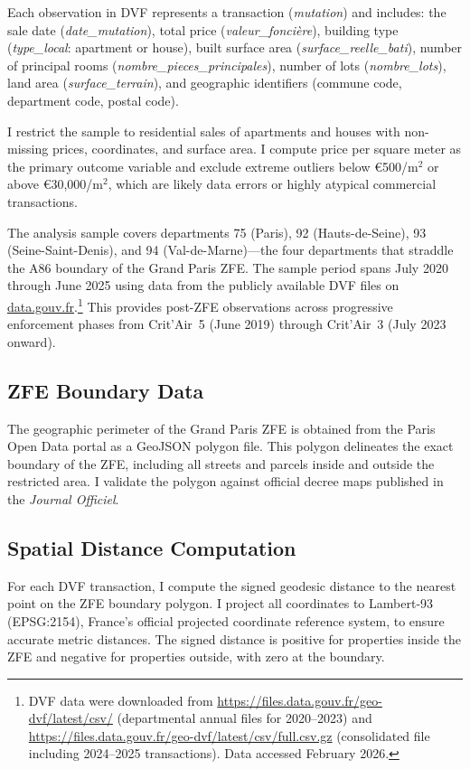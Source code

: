 \documentclass[12pt]{article}
\begin{document}
Each observation in DVF represents a transaction (\textit{mutation}) and includes: the sale date (\textit{date\_mutation}), total price (\textit{valeur\_fonci\`ere}), building type (\textit{type\_local}: apartment or house), built surface area (\textit{surface\_reelle\_bati}), number of principal rooms (\textit{nombre\_pieces\_principales}), number of lots (\textit{nombre\_lots}), land area (\textit{surface\_terrain}), and geographic identifiers (commune code, department code, postal code).

I restrict the sample to residential sales of apartments and houses with non-missing prices, coordinates, and surface area. I compute price per square meter as the primary outcome variable and exclude extreme outliers below \euro{}500/m$^2$ or above \euro{}30,000/m$^2$, which are likely data errors or highly atypical commercial transactions.

The analysis sample covers departments 75 (Paris), 92 (Hauts-de-Seine), 93 (Seine-Saint-Denis), and 94 (Val-de-Marne)---the four departments that straddle the A86 boundary of the Grand Paris ZFE. The sample period spans July 2020 through June 2025 using data from the publicly available DVF files on \url{data.gouv.fr}.\footnote{DVF data were downloaded from \url{https://files.data.gouv.fr/geo-dvf/latest/csv/} (departmental annual files for 2020--2023) and \url{https://files.data.gouv.fr/geo-dvf/latest/csv/full.csv.gz} (consolidated file including 2024--2025 transactions). Data accessed February 2026.} This provides post-ZFE observations across progressive enforcement phases from Crit'Air~5 (June 2019) through Crit'Air~3 (July 2023 onward).

\subsection{ZFE Boundary Data}

The geographic perimeter of the Grand Paris ZFE is obtained from the Paris Open Data portal as a GeoJSON polygon file. This polygon delineates the exact boundary of the ZFE, including all streets and parcels inside and outside the restricted area. I validate the polygon against official decree maps published in the \textit{Journal Officiel}.

\subsection{Spatial Distance Computation}

For each DVF transaction, I compute the signed geodesic distance to the nearest point on the ZFE boundary polygon. I project all coordinates to Lambert-93 (EPSG:2154), France's official projected coordinate reference system, to ensure accurate metric distances. The signed distance is positive for properties inside the ZFE and negative for properties outside, with zero at the boundary.
\end{document}

